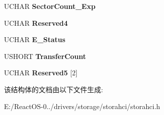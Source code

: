 \begin{DoxyCompactItemize}
U\+C\+H\+AR {\bfseries Sector\+Count\+\_\+\+Exp}
\item 
\mbox{\label{struct___a_h_c_i___p_i_o___s_e_t_u_p___f_i_s_a27e533e48f7803ad6339bfb6e5a572ff}} 
U\+C\+H\+AR {\bfseries Reserved4}
\item 
\mbox{\label{struct___a_h_c_i___p_i_o___s_e_t_u_p___f_i_s_a61ab1f4fcbc69ea62dbdfe5fdfde3dc7}} 
U\+C\+H\+AR {\bfseries E\+\_\+\+Status}
\item 
\mbox{\label{struct___a_h_c_i___p_i_o___s_e_t_u_p___f_i_s_a1713d38c1801aaaab4fe02e19dc6ab6c}} 
U\+S\+H\+O\+RT {\bfseries Transfer\+Count}
\item 
\mbox{\label{struct___a_h_c_i___p_i_o___s_e_t_u_p___f_i_s_a0f47566dd65ebe708de669f42aa9eb98}} 
U\+C\+H\+AR {\bfseries Reserved5} \mbox{[}2\mbox{]}
\end{DoxyCompactItemize}


该结构体的文档由以下文件生成\+:\begin{DoxyCompactItemize}
\item 
E\+:/\+React\+O\+S-\/0../drivers/storage/storahci/storahci.\+h\end{DoxyCompactItemize}
